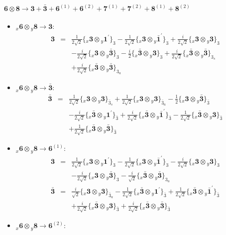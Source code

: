 \documentclass[english]{article}
\newcommand{\rep}[1]{\mathbf{#1}}
\newcommand{\repx}[2]{{}_{#2}\mathbf{#1}}
\newcommand{\subcg}[3]{\big\{ \repx{#1}{x}\otimes\repx{#2}{y}\big\}^{}_{#3}}
\begin{document}
\paragraph*{\Large $\rep{6}\otimes\rep{8}\to\rep{3}+\rep{\bar{3}}+\rep{6}^{(1)}+\rep{6}^{(2)}+\rep{7}^{(1)}+\rep{7}^{(2)}+\rep{8}^{(1)}+\rep{8}^{(2)}$}
\begin{itemize}
\item $\repx{6}{x}\otimes\repx{8}{y}\to\rep{3}$:
\begin{eqnarray*}
\rep{3} &=& \frac{1}{2 \sqrt{2}}\subcg{3}{1^{\prime}}{3}-\frac{1}{2 \sqrt{2}}\subcg{3}{\bar{1}^{\prime}}{3}+\frac{i}{2 \sqrt{2}}\subcg{3}{3}{3} \\ 
 & & -\frac{i}{2 \sqrt{2}}\subcg{3}{\bar{3}}{3}-\frac{i}{2}\subcg{\bar{3}}{3}{3}+\frac{i}{2 \sqrt{2}}\subcg{\bar{3}}{\bar{3}}{3_{s}} \\ 
 & & +\frac{i}{2 \sqrt{2}}\subcg{\bar{3}}{\bar{3}}{3_{a}}
\end{eqnarray*}
\item $\repx{6}{x}\otimes\repx{8}{y}\to\rep{\bar{3}}$:
\begin{eqnarray*}
\rep{\bar{3}} &=& \frac{1}{2 \sqrt{2}}\subcg{3}{3}{\bar{3}_{s}}+\frac{1}{2 \sqrt{2}}\subcg{3}{3}{\bar{3}_{a}}-\frac{1}{2}\subcg{3}{\bar{3}}{\bar{3}} \\ 
 & & -\frac{i}{2 \sqrt{2}}\subcg{\bar{3}}{1^{\prime}}{\bar{3}}+\frac{i}{2 \sqrt{2}}\subcg{\bar{3}}{\bar{1}^{\prime}}{\bar{3}}-\frac{1}{2 \sqrt{2}}\subcg{\bar{3}}{3}{\bar{3}} \\ 
 & & +\frac{1}{2 \sqrt{2}}\subcg{\bar{3}}{\bar{3}}{\bar{3}}
\end{eqnarray*}
\item $\repx{6}{x}\otimes\repx{8}{y}\to\rep{6}^{(1)}$:
\begin{eqnarray*}
\rep{3} &=& \frac{1}{2 \sqrt{2}}\subcg{3}{1^{\prime}}{3}-\frac{1}{2 \sqrt{2}}\subcg{3}{\bar{1}^{\prime}}{3}-\frac{i}{2 \sqrt{2}}\subcg{3}{3}{3} \\ 
 & & -\frac{i}{2 \sqrt{2}}\subcg{3}{\bar{3}}{3}-\frac{i}{\sqrt{2}}\subcg{\bar{3}}{\bar{3}}{3_{a}}
\\
\rep{\bar{3}} &=& \frac{i}{\sqrt{2}}\subcg{3}{3}{\bar{3}_{a}}-\frac{1}{2 \sqrt{2}}\subcg{\bar{3}}{1^{\prime}}{\bar{3}}+\frac{1}{2 \sqrt{2}}\subcg{\bar{3}}{\bar{1}^{\prime}}{\bar{3}} \\ 
 & & +\frac{i}{2 \sqrt{2}}\subcg{\bar{3}}{3}{\bar{3}}+\frac{i}{2 \sqrt{2}}\subcg{\bar{3}}{\bar{3}}{\bar{3}}
\end{eqnarray*}
\item $\repx{6}{x}\otimes\repx{8}{y}\to\rep{6}^{(2)}$:

\end{itemize}
\end{document}
